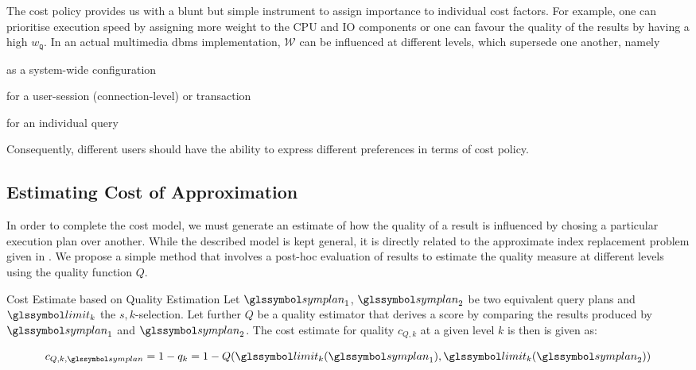 The cost policy provides us with a blunt but simple instrument to assign importance to individual cost factors. For example, one can prioritise execution speed by assigning more weight to the CPU and IO components or one can favour the quality of the results by having a high $w_{\mathtt{Q}}$. In an actual multimedia \acrshort{dbms} implementation, $\mathcal{W}$ can be influenced at different levels, which supersede one another, namely 
\begin{enumerate*}[label=(\roman*), itemjoin={{, }}, itemjoin*={{, or }}, after={{.}}]
    \item as a system-wide configuration
    \item for a user-session (connection-level) or transaction
    \item for an individual query
\end{enumerate*} 
Consequently, different users should have the ability to express different preferences in terms of cost policy.

\subsection{Estimating Cost of Approximation}
\label{section:quality_cost_estimation}

In order to complete the cost model, we must generate an estimate of how the quality of a result is influenced by chosing a particular execution plan over another. While the described model is kept general, it is directly related to the approximate index replacement problem given in . We propose a simple method that involves a post-hoc evaluation of results to estimate the quality measure at different levels using the quality function $Q$.

\begin{definition}[label=definition:cost_estimation_quality]{Cost Estimate based on Quality Estimation}{}
    Let $\symplan_1$, $\symplan_2$ be two equivalent query plans and $\limit_k$ the $s,k$-selection. Let further $Q$ be a quality estimator that derives a score by comparing the results produced by $\symplan_1$ and $\symplan_2$. The cost estimate for quality $c_{Q,k}$ at a given level $k$ is then is given as:
    
    \begin{equation*}
        c_{Q,k,\symplan} = 1 - q_k = 1 - Q(\limit_k(\symplan_1),\limit_k(\symplan_2))
    \end{equation*}
\end{definition}

